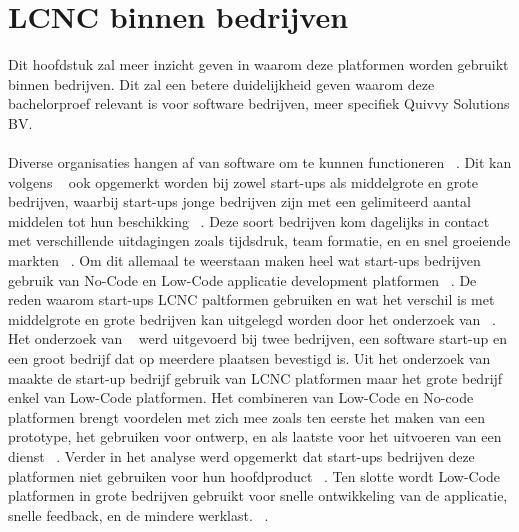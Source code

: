 \section{LCNC binnen bedrijven}
\label{sec:lcnc-bedrijven}
Dit hoofdstuk zal meer inzicht geven in waarom deze platformen worden gebruikt binnen bedrijven. Dit zal een betere duidelijkheid geven
waarom deze bachelorproef relevant is voor software bedrijven, meer specifiek Quivvy Solutions BV.
\\
\\
Diverse organisaties hangen af van software om te kunnen functioneren ~\autocite{Hintsch2021}. Dit kan volgens ~\textcite{Rafiq_2022} ook opgemerkt worden bij zowel
start-ups als middelgrote en grote bedrijven, waarbij start-ups jonge bedrijven zijn met een gelimiteerd aantal middelen tot hun beschikking ~\autocite{Rafiq_2022}. Deze soort bedrijven
kom dagelijks in contact met verschillende uitdagingen zoals tijdsdruk, team formatie, en en snel groeiende markten ~\autocite{Rafiq_2022}. Om dit allemaal te weerstaan maken heel wat
start-ups bedrijven gebruik van No-Code en Low-Code applicatie development platformen ~\autocite{Rafiq_2022}. De reden waarom start-ups LCNC paltformen gebruiken en wat het verschil is met 
middelgrote en grote bedrijven kan uitgelegd worden door het onderzoek van ~\textcite{Rafiq_2022}. Het onderzoek van ~\textcite{Rafiq_2022} werd uitgevoerd bij twee bedrijven, een software start-up en een groot bedrijf
dat op meerdere plaatsen bevestigd is. Uit het onderzoek van ~\textcite{Rafiq_2022} maakte de start-up bedrijf gebruik van LCNC platformen maar het grote bedrijf enkel van Low-Code platformen. Het combineren van Low-Code en No-code platformen
brengt voordelen met zich mee zoals ten eerste het maken van een prototype, het gebruiken voor ontwerp, en als laatste voor het uitvoeren van een dienst ~\autocite{Rafiq_2022}. 
Verder in het analyse werd opgemerkt dat start-ups bedrijven deze platformen niet gebruiken voor hun hoofdproduct ~\autocite{Rafiq_2022}. Ten slotte wordt
Low-Code platformen in grote bedrijven gebruikt voor snelle ontwikkeling van de applicatie, snelle feedback, en de mindere werklast. ~\autocite{Rafiq_2022}.




